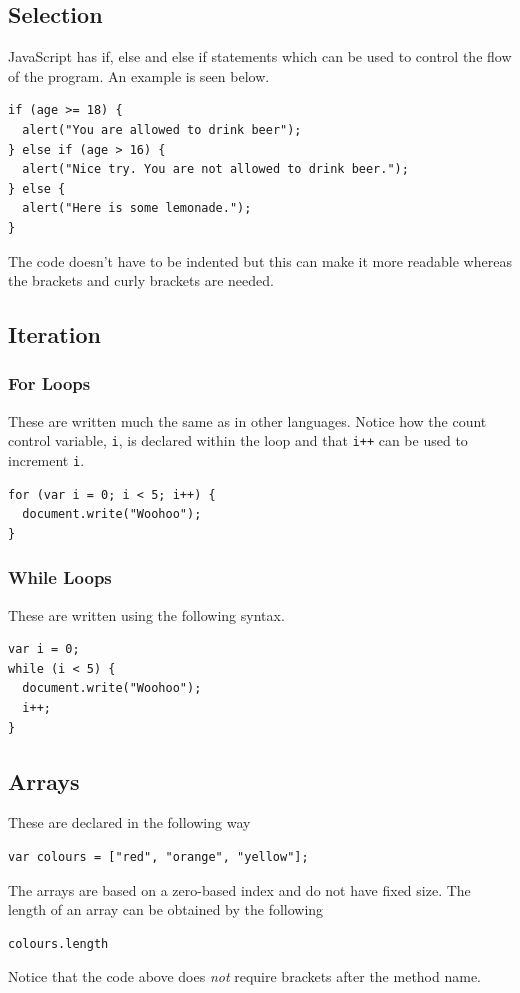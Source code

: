 \documentclass{thomasClass}
\begin{document}
\subsection{Selection}
JavaScript has if, else and else if statements which can be used to control the flow of the program. An example is seen below.
\begin{Verbatim}[breaklines=true, breakanywhere=true]
if (age >= 18) {
  alert("You are allowed to drink beer");
} else if (age > 16) {
  alert("Nice try. You are not allowed to drink beer.");
} else {
  alert("Here is some lemonade.");
}
\end{Verbatim}
The code doesn’t have to be indented but this can make it more readable whereas the brackets and curly brackets are needed. 
\subsection{Iteration}
\subsubsection{For Loops}
These are written much the same as in other languages. Notice how the count control variable, \verb|i|, is declared within the loop and that \verb|i++| can be used to increment \verb|i|.
\begin{Verbatim}[breaklines=true, breakanywhere=true]
for (var i = 0; i < 5; i++) {
  document.write("Woohoo");
}
\end{Verbatim}
\subsubsection{While Loops}
These are written using the following syntax.
\begin{Verbatim}[breaklines=true, breakanywhere=true]
var i = 0;
while (i < 5) {
  document.write("Woohoo");
  i++;
}
\end{Verbatim}
\subsection{Arrays}
These are declared in the following way
\begin{Verbatim}[breaklines=true, breakanywhere=true]
var colours = ["red", "orange", "yellow"];
\end{Verbatim}
The arrays are based on a zero-based index and do not have fixed size. The length of an array can be obtained by the following
\begin{Verbatim}[breaklines=true, breakanywhere=true]
colours.length
\end{Verbatim}
Notice that the code above does \textit{not} require brackets after the method name.
\end{document}
